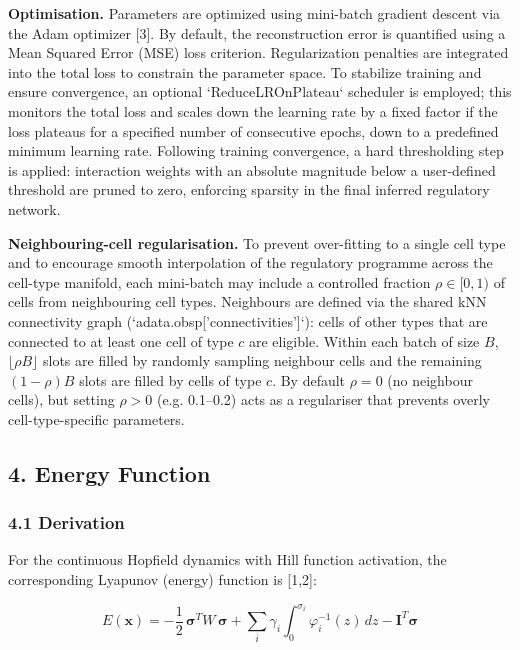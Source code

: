 \documentclass[11pt]{article}
\begin{document}
\textbf{Optimisation.} Parameters are optimized using mini-batch gradient descent via the Adam optimizer [3]. By default, the reconstruction error is quantified using a Mean Squared Error (MSE) loss criterion. Regularization penalties are integrated into the total loss to constrain the parameter space. To stabilize training and ensure convergence, an optional `ReduceLROnPlateau` scheduler is employed; this monitors the total loss and scales down the learning rate by a fixed factor if the loss plateaus for a specified number of consecutive epochs, down to a predefined minimum learning rate. Following training convergence, a hard thresholding step is applied: interaction weights with an absolute magnitude below a user-defined threshold are pruned to zero, enforcing sparsity in the final inferred regulatory network.

\textbf{Neighbouring-cell regularisation.} To prevent over-fitting to a single cell type and to encourage smooth interpolation of the regulatory programme across the cell-type manifold, each mini-batch may include a controlled fraction $\rho \in [0, 1)$ of cells from neighbouring cell types. Neighbours are defined via the shared kNN connectivity graph (`adata.obsp['connectivities']`): cells of other types that are connected to at least one cell of type $c$ are eligible. Within each batch of size $B$, $\lfloor \rho B \rfloor$ slots are filled by randomly sampling neighbour cells and the remaining $(1-\rho)B$ slots are filled by cells of type $c$. By default $\rho = 0$ (no neighbour cells), but setting $\rho > 0$ (e.g. 0.1--0.2) acts as a regulariser that prevents overly cell-type-specific parameters.



\subsection*{4. Energy Function}


\subsubsection*{4.1 Derivation}

For the continuous Hopfield dynamics with Hill function activation, the corresponding Lyapunov (energy) function is [1,2]:


\begin{equation}
E(\mathbf{x}) = -\frac{1}{2}\,\boldsymbol{\sigma}^T W\,\boldsymbol{\sigma} + \sum_i \gamma_i \int_0^{\sigma_i} \varphi_i^{-1}(z)\,dz - \mathbf{I}^T\boldsymbol{\sigma} 
\end{equation}
\end{document}
